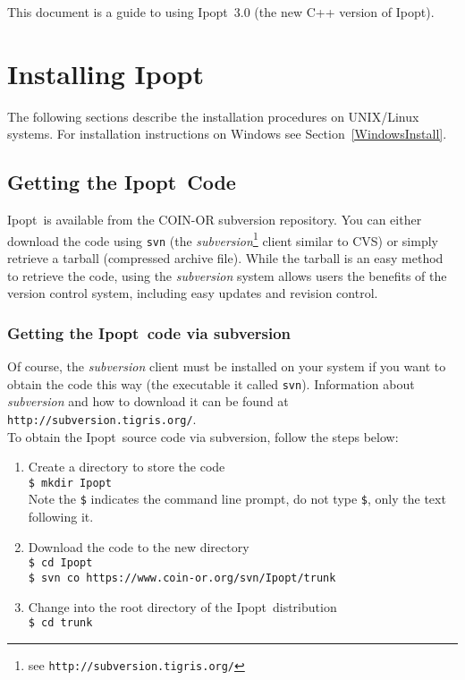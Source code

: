 \documentclass[letter,10pt]{article}
\newcommand{\Ipopt}{{\sc Ipopt}}
\begin{document}
This document is a guide to using \Ipopt\ 3.0 (the new C++ version of \Ipopt).

\section{Installing \Ipopt}\label{Installing}

The following sections describe the installation procedures on
UNIX/Linux systems.  For installation instructions on Windows
see Section~\ref{WindowsInstall}.

\subsection{Getting the \Ipopt\ Code}
\Ipopt\ is available from the COIN-OR subversion repository. You can
either download the code using \texttt{svn} (the
\textit{subversion}\footnote{see
  \texttt{http://subversion.tigris.org/}} client similar to CVS) or
simply retrieve a tarball (compressed archive file).  While the
tarball is an easy method to retrieve the code, using the
\textit{subversion} system allows users the benefits of the version
control system, including easy updates and revision control.

\subsubsection{Getting the \Ipopt\ code via subversion}

Of course, the \textit{subversion} client must be installed on your
system if you want to obtain the code this way (the executable it
called \texttt{svn}).  Information about \textit{subversion} and how
to download it can be found at \texttt{http://subversion.tigris.org/}.\\

To obtain the \Ipopt\ source code via subversion, follow the steps
below:
\begin{enumerate}
\item{Create a directory to store the code}\\
{\tt \$ mkdir Ipopt}\\ 
Note the {\tt \$} indicates the command line
prompt, do not type {\tt \$}, only the text following it.
\item{Download the code to the new directory}\\
{\tt \$ cd Ipopt\\
\$ svn co https://www.coin-or.org/svn/Ipopt/trunk}
\item Change into the root directory of the \Ipopt\ distribution\\
{\tt \$ cd trunk}
\end{enumerate}
\end{document}
